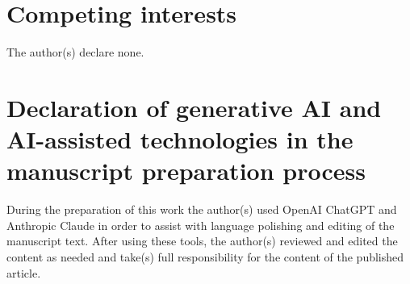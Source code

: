 \documentclass[11pt,letterpaper]{article}
\numberwithin{equation}{section}
\theoremstyle{plain}
\theoremstyle{definition}
\theoremstyle{remark}
\begin{document}








\section*{Competing interests}

The author(s) declare none.

\section*{Declaration of generative AI and AI-assisted technologies in the manuscript preparation process}

During the preparation of this work the author(s) used OpenAI ChatGPT and
Anthropic Claude in order to assist with language polishing and editing of the
manuscript text.  After using these tools, the author(s) reviewed and edited
the content as needed and take(s) full responsibility for the content of the
published article.



\end{document}
